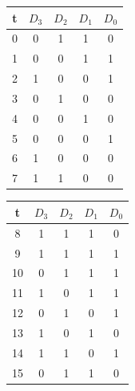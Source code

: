 \begin{center}
\begin{minipage}{0.5\textwidth}
\centering
\begin{tabular}{ c | c | c | c | c }
 \label{table:lfsr}
  t & $D_3$ & $D_2$ & $D_1$ & $D_0$ \\ \hline
  0 & 0 & 1 & 1 & 0 \\
  1 & 0& 0& 1& 1\\
  2 & 1&0 &0 &1 \\
  3 & 0& 1& 0& 0\\
  4 & 0&0 &1 &0 \\
  5 & 0&0 &0 &1 \\
  6 & 1&0 &0 &0 \\
  7 & 1&1 &0 &0 \\
  \end{tabular}
\end{minipage}%
\begin{minipage}{0.5\textwidth} 
\centering
\begin{tabular}{ c | c | c | c | c }
  t & $D_3$ & $D_2$ & $D_1$ & $D_0$ \\ \hline
  8  & 1& 1& 1& 0\\
  9  & 1& 1& 1& 1\\
  10 & 0& 1& 1& 1\\
  11 & 1& 0& 1& 1\\
  12 & 0& 1& 0& 1\\
  13 & 1& 0& 1& 0\\
  14 & 1& 1& 0& 1\\
  15 & 0& 1& 1& 0\\
\end{tabular}
\end{minipage}
\end{center}

